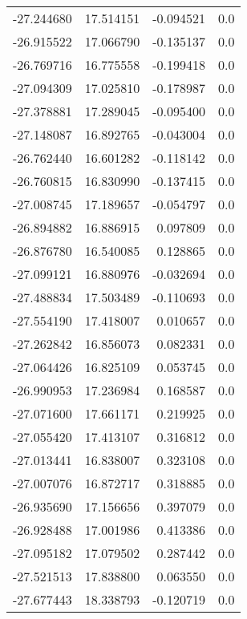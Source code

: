 \begin{tabular}{rrrr}
      -27.244680 &        17.514151 &   -0.094521 &   0.0 \\
      -26.915522 &        17.066790 &   -0.135137 &   0.0 \\
      -26.769716 &        16.775558 &   -0.199418 &   0.0 \\
      -27.094309 &        17.025810 &   -0.178987 &   0.0 \\
      -27.378881 &        17.289045 &   -0.095400 &   0.0 \\
      -27.148087 &        16.892765 &   -0.043004 &   0.0 \\
      -26.762440 &        16.601282 &   -0.118142 &   0.0 \\
      -26.760815 &        16.830990 &   -0.137415 &   0.0 \\
      -27.008745 &        17.189657 &   -0.054797 &   0.0 \\
      -26.894882 &        16.886915 &    0.097809 &   0.0 \\
      -26.876780 &        16.540085 &    0.128865 &   0.0 \\
      -27.099121 &        16.880976 &   -0.032694 &   0.0 \\
      -27.488834 &        17.503489 &   -0.110693 &   0.0 \\
      -27.554190 &        17.418007 &    0.010657 &   0.0 \\
      -27.262842 &        16.856073 &    0.082331 &   0.0 \\
      -27.064426 &        16.825109 &    0.053745 &   0.0 \\
      -26.990953 &        17.236984 &    0.168587 &   0.0 \\
      -27.071600 &        17.661171 &    0.219925 &   0.0 \\
      -27.055420 &        17.413107 &    0.316812 &   0.0 \\
      -27.013441 &        16.838007 &    0.323108 &   0.0 \\
      -27.007076 &        16.872717 &    0.318885 &   0.0 \\
      -26.935690 &        17.156656 &    0.397079 &   0.0 \\
      -26.928488 &        17.001986 &    0.413386 &   0.0 \\
      -27.095182 &        17.079502 &    0.287442 &   0.0 \\
      -27.521513 &        17.838800 &    0.063550 &   0.0 \\
      -27.677443 &        18.338793 &   -0.120719 &   0.0 \\

\end{tabular}
